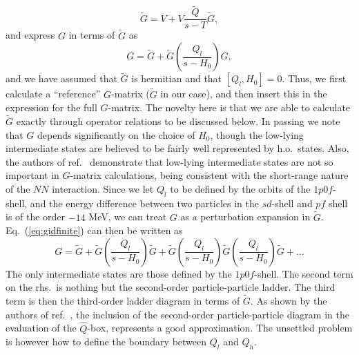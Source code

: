 \documentclass[twoside,12pt]{article}
\begin{document}
\begin{equation}
     \tilde{G}=V+V\frac{\tilde{Q}}{s -T}\tilde{G},
\label{eq:gfinite}
\end{equation}
and  express $G$ in terms of $\tilde{G}$ as
\begin{equation}
        G=\tilde{G} +\tilde{G}
        \left(\frac{Q_l}{s -H_0}\right)G,
        \label{eq:gidfinite}
\end{equation}
and we have assumed that $\tilde{G}$ is hermitian and that $[Q_l,H_0]=0$.
Thus, we first calculate
a ``reference'' $G$-matrix ($\tilde{G}$ in our case), and then insert this
in the expression for the full $G$-matrix. The novelty here is that
we are able to calculate $\tilde{G}$ exactly through operator relations
to be discussed below. In passing we note that $G$ depends significantly
on the choice of $H_0$, though the low-lying intermediate states
are believed to be fairly well represented by h.o.\ states.
Also, the authors of ref.\ \cite{kkko76} demonstrate that low-lying
intermediate states are not so important in $G$-matrix calculations,
being consistent with the short-range nature of the $NN$ interaction.
Since we let $Q_l$ to be defined by the orbits of the $1p0f$-shell,
and the energy difference between two particles in the
$sd$-shell and $pf$ shell is of the order $-14$ MeV, we can treat
$G$ as a perturbation expansion in $\tilde{G}$.
Eq.\ (\ref{eq:gidfinite}) can then be written as
\begin{equation}
        G=\tilde{G} +\tilde{G}
        \left(\frac{Q_l}{s -H_0}\right)\tilde{G}
        +\tilde{G}
        \left(\frac{Q_l}{s -H_0}\right)\tilde{G}
        \left(\frac{Q_l}{s -H_0}\right)\tilde{G} +\dots
\end{equation}
The only intermediate states are those defined by the $1p0f$-shell.
The second term on the rhs.\ is nothing but the second-order
particle-particle ladder. The third term is then the third-order ladder
diagram in terms of
$\tilde{G}$. As shown by the authors of ref.\ \cite{kkko76}, the inclusion
of the second-order particle-particle diagram in the evaluation
of the $\hat{Q}$-box, represents a good approximation.
The unsettled problem is however how to define
the boundary between
$Q_l$ and $Q_h$.
\end{document}
